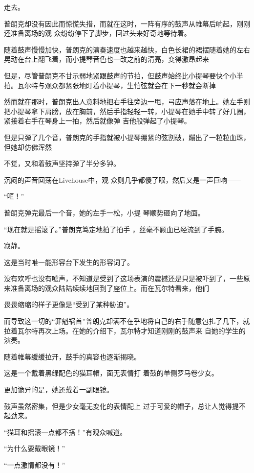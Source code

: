 \documentclass{article}
\begin{document}
\newpage
走去。 

普朗克却没有因此而惊慌失措，而就在这时，一阵有序的鼓声从帷幕后响起，刚刚还准备离场的观
众纷纷停下了脚步，回过头来好奇地等待着。 

随着鼓声慢慢加快，普朗克的演奏速度也越来越快，白色长裙的裙摆随着她的左右晃动在台上翻飞着，而小提琴音色也一改之前的清亮，变得激昂起来

但是，尽管普朗克不甘示弱地紧跟鼓声的节拍，但鼓声始终比小提琴要快个小半拍。瓦尔特与观众都紧张地盯着小提琴，生怕弦就会在下一秒就会断掉

然而就在那时，普朗克出人意料地把右手往旁边一甩，弓应声落在地上。她左手则把小提琴拿下肩膀，放在胸前，然后手指轻轻一转，小提琴在她手中转了好几圈，紧接着右手在琴身上一拍，然后就像弹
吉他般弹起了小提琴。 

但是只弹了几个音，普朗克的手指就被小提琴绷紧的弦割破，蹦出了一粒粒血珠，但她却仿佛浑然
\newpage

不觉，又和着鼓声坚持弹了半分多钟。 

沉闷的声音回荡在Livehouse中，观
众则几乎都傻了眼，然后又是一声巨响—— 


“哐！” 

普朗克弹完最后一个音，她的左手一松，小提
琴顺势砸向了地面。 

“现在就是摇滚了。”普朗克笃定地拍了拍手
，丝毫不顾血已经流到了手腕。 


寂静。 


这是当时唯一能形容台下发生的形容词了。 

没有欢呼也没有嘘声，不知道是受到了这场表演的震撼还是只是被吓到了，一些原来准备离场的观众陆陆续续地回到了座位上。而在瓦尔特看来，他们

\newpage
畏畏缩缩的样子更像是“受到了某种胁迫”。 

而导致这一切的“罪魁祸首”普朗克却满不在乎地将自己的右手随意包扎了几下，就拉着瓦尔特再次上场。在她的介绍下，瓦尔特才知道刚刚的鼓声来
自她的学生的演奏。 

随着帷幕缓缓拉开，鼓手的真容也逐渐揭晓。

这是一个戴着黑绿配色的猫耳帽，面无表情打
着鼓的单侧罗马卷少女。 


更加诡异的是，她还戴着一副眼镜。 

鼓声虽然密集，但是少女毫无变化的表情配上
过于可爱的帽子，总让人觉得提不起劲来。 


“猫耳和摇滚一点都不搭！”有观众喊道。 


“为什么要戴眼镜！” 


\newpage

“一点激情都没有！” 
\end{document}
